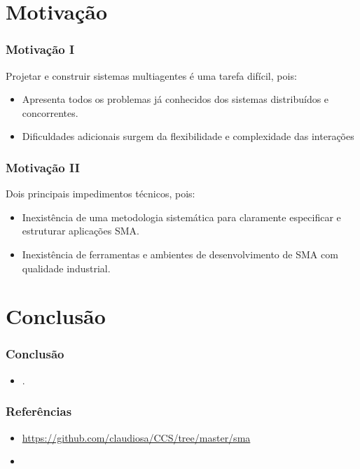 \documentclass[10pt]{beamer}
\begin{document}
\section{Motivação}
\begin{frame}

    \frametitle{Motivação I}
    Projetar e construir sistemas multiagentes é uma tarefa difícil, pois:
    \begin{itemize}
    \pause
      \item Apresenta todos os problemas já conhecidos 
dos sistemas distribuídos e concorrentes.
\pause
      \item Dificuldades adicionais surgem da flexibilidade 
e complexidade das interações
    
    \end{itemize}
\end{frame}



\begin{frame}

    \frametitle{Motivação II}
   Dois principais impedimentos técnicos, pois:
    \begin{itemize}
    \pause
      \item Inexistência de uma metodologia sistemática para claramente especificar e estruturar aplicações SMA.
\pause
      \item Inexistência de ferramentas e ambientes de 
desenvolvimento de SMA com qualidade industrial.
    
    \end{itemize}
\end{frame}




\section{Conclusão}
\begin{frame}
    \frametitle{Conclusão}
    \begin{itemize}
    \item .
    \end{itemize}
\end{frame}


\begin{frame}
    \frametitle{Referências}
    \begin{itemize}
     \item \url{https://github.com/claudiosa/CCS/tree/master/sma}
     \item \url{}
    \end{itemize}
\end{frame}

\end{document}
